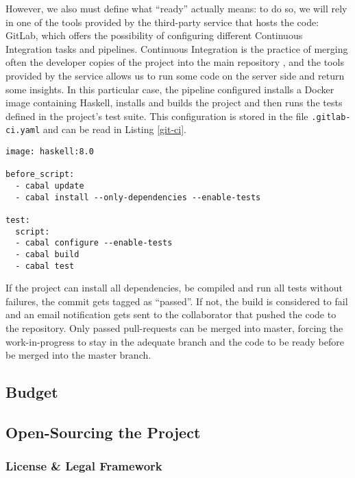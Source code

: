 However, we also must define what ``ready'' actually means: to do so, we will
rely in one of the tools provided by the third-party service that hosts the
code: GitLab, which offers the possibility of configuring different Continuous
Integration tasks and pipelines. Continuous Integration is the practice of
merging often the developer copies of the project into the main repository
\cite{fowler-2006-ci}, and the tools provided by the service allows us to run
some code on the server side and return some insights. In this particular case,
the pipeline configured installs a Docker image containing Haskell, installs
and builds the project and then runs the tests defined in the project's test
suite. This configuration is stored in the file \texttt{.gitlab-ci.yaml} and
can be read in Listing \ref{git-ci}.\\

\begin{lstlisting}[label=git-ci,
caption=Continuous Integration pipeline configuration]
image: haskell:8.0

before_script:
  - cabal update
  - cabal install --only-dependencies --enable-tests

test:
  script:
  - cabal configure --enable-tests
  - cabal build
  - cabal test
\end{lstlisting}

If the project can install all dependencies, be compiled and run all tests
without failures, the commit gets tagged as ``passed''. If not, the build is
considered to fail and an email notification gets sent to the collaborator that
pushed the code to the repository. Only passed pull-requests can be merged into
master, forcing the work-in-progress to stay in the adequate branch and the
code to be ready before be merged into the master branch.\\


\subsection{Budget}

\subsection{Open-Sourcing the Project}

\subsubsection{License \& Legal Framework}

